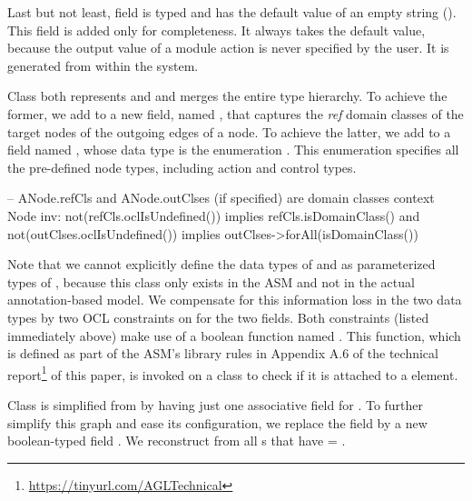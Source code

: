 \begin{description}
Last but not least, field  is typed  and has the default value of an empty string (\strq{}). This field is added only for completeness. It always takes the default value, because the output value of a module action is never specified by the user. It is generated from within the system.
%
\item[\clazz{ANode}.] Class  both represents  and  and merges the entire  type hierarchy. To achieve the former, we add to  a new field, named , that captures the \textit{ref} domain classes of the target nodes of the outgoing edges of a node. To achieve the latter, we add to  a field named , whose data type is the enumeration . This enumeration specifies all the pre-defined node types, including action and control types.

\begin{lstrule}
-- ANode.refCls and ANode.outClses (if specified) are domain classes
context Node inv:
  not(refCls.oclIsUndefined()) implies refCls.isDomainClass() and 
  not(outClses.oclIsUndefined()) implies outClses->forAll(isDomainClass())
\end{lstrule}

Note that we cannot explicitly define the data types of  and  as parameterized types of , because this class only exists in the ASM and not in the actual annotation-based model. We compensate for this information loss in the two data types by two OCL constraints on  for the two fields. Both constraints (listed immediately above) make use of a boolean function named . This function, which is defined as part of the ASM's library rules in Appendix A.6 of the technical report\footnote{\url{https://tinyurl.com/AGLTechnical}} of this paper, %
is invoked on a class to check if it is attached to a  element. 
%
\item[\clazz{AGraph}.] Class  is simplified from  by having just one associative field for . To further simplify this graph and ease its configuration, we replace the field  by a new boolean-typed field . We reconstruct  from all s that have  = .
\end{description}


